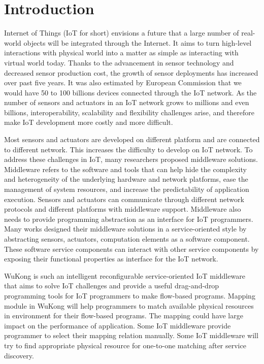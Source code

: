 \section{Introduction}
\label{c:intro}


Internet of Things (IoT for short) envisions a future that a large number of real-world objects will be integrated through the Internet. It aims to turn high-level interactions with physical world into a matter as simple as interacting with virtual world today\cite{Teixeira2013}. Thanks to the advancement in sensor technology and decreased sensor production cost, the growth of sensor deployments has increased over past five years. It was also estimated by European Commission that we would have 50 to 100 billions devices connected through the IoT network\cite{Sundmaeker2010}. As the number of sensors and actuators in an IoT network grows to millions and even billions, interoperability, scalability and flexibility challenges arise\cite{Teixeira2013}, and therefore make IoT development more costly and more difficult. 


Most sensors and actuators are developed on different platform and are connected to different network. This increases the difficulty to develop on IoT network. To address these challenges in IoT, many researchers proposed middleware solutions. Middleware refers to the software and tools that can help hide the complexity and heterogeneity of the underlying hardware and network platforms, ease the management of system resources, and increase the predictability of application execution\cite{Wang2008}. Sensors and actuators can communicate through different network protocols and different platforms with middleware support. Middleware also needs to provide programming abstraction as an interface for IoT programmers. Many works designed their middleware solutions in a service-oriented style by abstracting sensors, actuators, computation elements as a software component\cite{Barr2002,Fok,Hughes}. These software service components can interact with other service components by exposing their functional properties as interface for the IoT network. 

WuKong is such an intelligent reconfigurable service-oriented IoT middleware that aims to solve IoT challenges and provide a useful drag-and-drop programming tools for IoT programmers to make flow-based programs. Mapping module in WuKong will help programmers to match available physical resources in environment for their flow-based programs. The mapping could have large impact on the performance of application. Some IoT middleware provide programmer to select their mapping relation manually. Some IoT middleware will try to find appropriate physical resource for one-to-one matching after service discovery.



